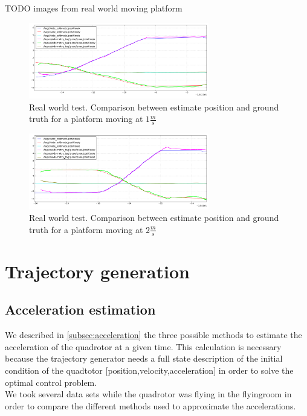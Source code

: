 TODO images from real world moving platform
\begin{figure}[!ht]
    \centering
    \includegraphics[width=0.7\textwidth]{img/position_real_world.png}
    \caption{Real world test. Comparison between estimate position and ground truth for a platform moving at $1\frac{m}{s}$}
    \label{fig:ekf_position_real}
\end{figure}

\begin{figure}[!ht]
    \centering
    \includegraphics[width=0.7\textwidth]{img/position_real_world_fast.png}
      \caption{Real world test. Comparison between estimate position and ground truth for a platform moving at $2\frac{m}{s}$}
    \label{fig:ekf_position_real_fast}
\end{figure}

\newpage

\section{Trajectory generation}

\subsection{Acceleration estimation} \label{subsec:acceleration_experiments}
We described in \ref{subsec:acceleration} the three possible methods to estimate the acceleration of the quadrotor at a given time. This calculation is necessary because the trajectory generator needs a full state description of the initial condition of the quadtotor [position,velocity,acceleration] in order to solve the optimal control problem.\\
We took several data sets while the quadrotor was flying in the flyingroom in order to compare the different methods used to approximate the accelerations.\\

